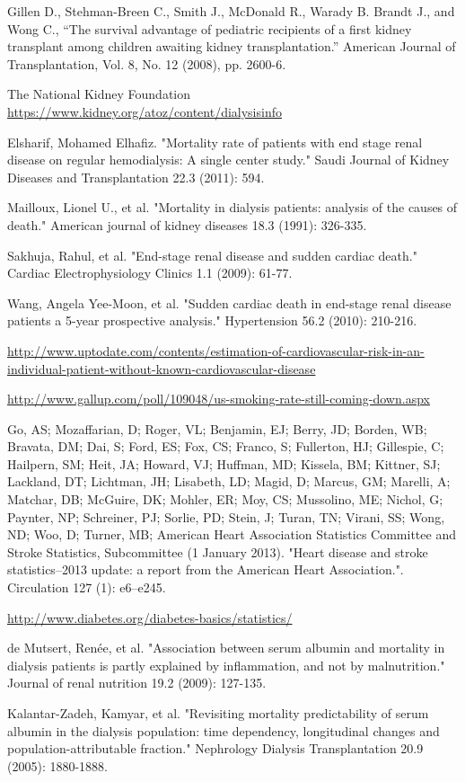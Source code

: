 \documentclass[paper=a4, fontsize=11pt]{scrartcl} %
\numberwithin{equation}{section} %
\numberwithin{figure}{section} %
\numberwithin{table}{section} %
\begin{document}
\begin{thebibliography}{9}
Gillen D., Stehman-Breen C., Smith J., McDonald R., Warady B. Brandt J., and Wong C., “The survival advantage
of pediatric recipients of a first kidney transplant among children awaiting kidney transplantation.” American Journal of
Transplantation, Vol. 8, No. 12 (2008), pp. 2600-6.


The National Kidney Foundation
\url{https://www.kidney.org/atoz/content/dialysisinfo}

Elsharif, Mohamed Elhafiz. "Mortality rate of patients with end stage renal disease on regular hemodialysis: A single center study." Saudi Journal of Kidney Diseases and Transplantation 22.3 (2011): 594.

Mailloux, Lionel U., et al. "Mortality in dialysis patients: analysis of the causes of death." American journal of kidney diseases 18.3 (1991): 326-335.

Sakhuja, Rahul, et al. "End-stage renal disease and sudden cardiac death." Cardiac Electrophysiology Clinics 1.1 (2009): 61-77.

Wang, Angela Yee-Moon, et al. "Sudden cardiac death in end-stage renal disease patients a 5-year prospective analysis." Hypertension 56.2 (2010): 210-216.

\url{http://www.uptodate.com/contents/estimation-of-cardiovascular-risk-in-an-individual-patient-without-known-cardiovascular-disease}

\url{http://www.gallup.com/poll/109048/us-smoking-rate-still-coming-down.aspx}

Go, AS; Mozaffarian, D; Roger, VL; Benjamin, EJ; Berry, JD; Borden, WB; Bravata, DM; Dai, S; Ford, ES; Fox, CS; Franco, S; Fullerton, HJ; Gillespie, C; Hailpern, SM; Heit, JA; Howard, VJ; Huffman, MD; Kissela, BM; Kittner, SJ; Lackland, DT; Lichtman, JH; Lisabeth, LD; Magid, D; Marcus, GM; Marelli, A; Matchar, DB; McGuire, DK; Mohler, ER; Moy, CS; Mussolino, ME; Nichol, G; Paynter, NP; Schreiner, PJ; Sorlie, PD; Stein, J; Turan, TN; Virani, SS; Wong, ND; Woo, D; Turner, MB; American Heart Association Statistics Committee and Stroke Statistics, Subcommittee (1 January 2013). "Heart disease and stroke statistics--2013 update: a report from the American Heart Association.". Circulation 127 (1): e6–e245.

\url{http://www.diabetes.org/diabetes-basics/statistics/}

de Mutsert, Renée, et al. "Association between serum albumin and mortality in dialysis patients is partly explained by inflammation, and not by malnutrition." Journal of renal nutrition 19.2 (2009): 127-135.

Kalantar-Zadeh, Kamyar, et al. "Revisiting mortality predictability of serum albumin in the dialysis population: time dependency, longitudinal changes and population-attributable fraction." Nephrology Dialysis Transplantation 20.9 (2005): 1880-1888.


 
\end{thebibliography}
\end{document}
